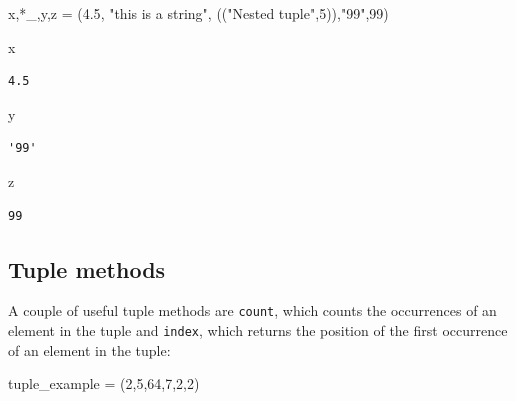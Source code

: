 \documentclass[
  letterpaper,
  DIV=11,
  numbers=noendperiod]{scrreprt}
\newenvironment{Shaded}{\begin{snugshade}}{\end{snugshade}}
\newcommand{\DecValTok}[1]{\textcolor[rgb]{0.68,0.00,0.00}{#1}}
\newcommand{\FloatTok}[1]{\textcolor[rgb]{0.68,0.00,0.00}{#1}}
\newcommand{\NormalTok}[1]{\textcolor[rgb]{0.00,0.23,0.31}{#1}}
\newcommand{\OperatorTok}[1]{\textcolor[rgb]{0.37,0.37,0.37}{#1}}
\newcommand{\StringTok}[1]{\textcolor[rgb]{0.13,0.47,0.30}{#1}}
\begin{document}
\begin{Shaded}
\begin{Highlighting}[]
\NormalTok{x,}\OperatorTok{*}\NormalTok{\_,y,z  }\OperatorTok{=}\NormalTok{ (}\FloatTok{4.5}\NormalTok{, }\StringTok{"this is a string"}\NormalTok{, ((}\StringTok{"Nested tuple"}\NormalTok{,}\DecValTok{5}\NormalTok{)),}\StringTok{"99"}\NormalTok{,}\DecValTok{99}\NormalTok{)}
\end{Highlighting}
\end{Shaded}

\begin{Shaded}
\begin{Highlighting}[]
\NormalTok{x}
\end{Highlighting}
\end{Shaded}

\begin{verbatim}
4.5
\end{verbatim}

\begin{Shaded}
\begin{Highlighting}[]
\NormalTok{y}
\end{Highlighting}
\end{Shaded}

\begin{verbatim}
'99'
\end{verbatim}

\begin{Shaded}
\begin{Highlighting}[]
\NormalTok{z}
\end{Highlighting}
\end{Shaded}

\begin{verbatim}
99
\end{verbatim}

\hypertarget{tuple-methods}{%
\subsection{Tuple methods}\label{tuple-methods}}

A couple of useful tuple methods are \texttt{count}, which counts the
occurrences of an element in the tuple and \texttt{index}, which returns
the position of the first occurrence of an element in the tuple:

\begin{Shaded}
\begin{Highlighting}[]
\NormalTok{tuple\_example }\OperatorTok{=}\NormalTok{ (}\DecValTok{2}\NormalTok{,}\DecValTok{5}\NormalTok{,}\DecValTok{64}\NormalTok{,}\DecValTok{7}\NormalTok{,}\DecValTok{2}\NormalTok{,}\DecValTok{2}\NormalTok{)}
\end{Highlighting}
\end{Shaded}
\end{document}
